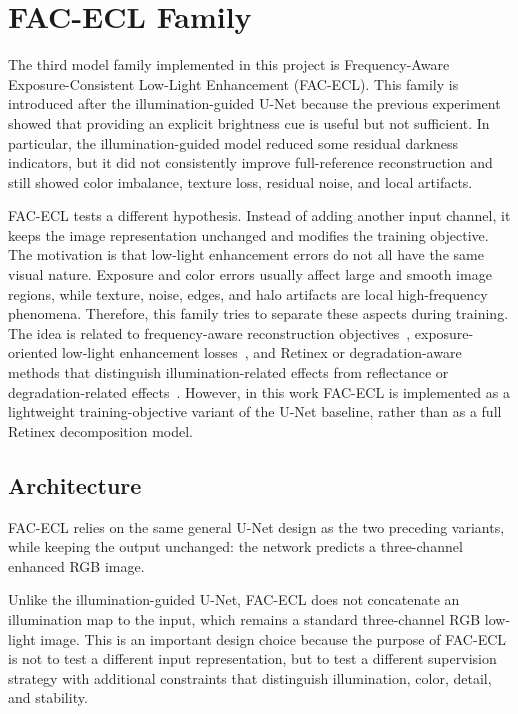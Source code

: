 \section{FAC-ECL Family}

The third model family implemented in this project is Frequency-Aware Exposure-Consistent Low-Light Enhancement (FAC-ECL). This family is introduced after the illumination-guided U-Net because the previous experiment showed that providing an explicit brightness cue is useful but not sufficient. In particular, the illumination-guided model reduced some residual darkness indicators, but it did not consistently improve full-reference reconstruction and still showed color imbalance, texture loss, residual noise, and local artifacts.

FAC-ECL tests a different hypothesis. Instead of adding another input channel, it keeps the image representation unchanged and modifies the training objective. The motivation is that low-light enhancement errors do not all have the same visual nature. Exposure and color errors usually affect large and smooth image regions, while texture, noise, edges, and halo artifacts are local high-frequency phenomena. Therefore, this family tries to separate these aspects during training. The idea is related to frequency-aware reconstruction objectives~\cite{DBLP:conf/iccv/JiangDWL21}, exposure-oriented low-light enhancement losses~\cite{DBLP:conf/cvpr/GuoLGLHKC20}, and Retinex or degradation-aware methods that distinguish illumination-related effects from reflectance or degradation-related effects~\cite{DBLP:conf/bmvc/WeiWY018, DBLP:journals/dsp/WeiLL24}. However, in this work FAC-ECL is implemented as a lightweight training-objective variant of the U-Net baseline, rather than as a full Retinex decomposition model.

\subsection{Architecture}

FAC-ECL relies on the same general U-Net design as the two preceding variants, while keeping the output unchanged: the network predicts a three-channel enhanced RGB image.

Unlike the illumination-guided U-Net, FAC-ECL does not concatenate an illumination map to the input, which remains a standard three-channel RGB low-light image. This is an important design choice because the purpose of FAC-ECL is not to test a different input representation, but to test a different supervision strategy with additional constraints that distinguish illumination, color, detail, and stability.

